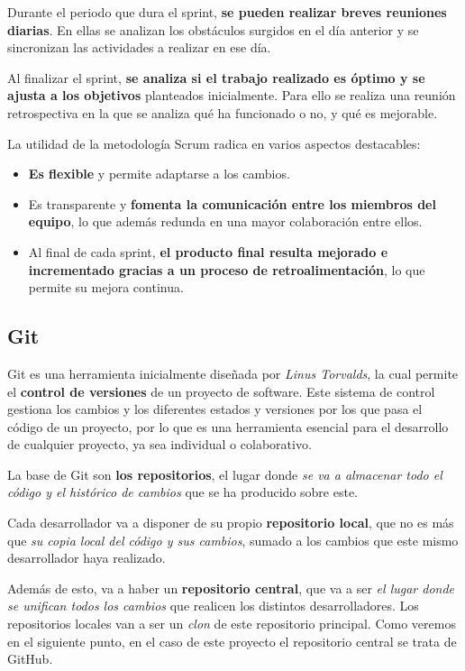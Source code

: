 Durante el periodo que dura el sprint, \textbf{se pueden realizar breves reuniones diarias}. En ellas se analizan los obstáculos surgidos en el día anterior y se sincronizan las actividades a realizar en ese día.

Al finalizar el sprint, \textbf{se analiza si el trabajo realizado es óptimo y se ajusta a los objetivos} planteados inicialmente. Para ello se realiza una reunión retrospectiva en la que se analiza qué ha funcionado o no, y qué es mejorable.

La utilidad de la metodología Scrum radica en varios aspectos destacables:
\begin{itemize}
  \item \textbf{Es flexible} y permite adaptarse a los cambios.
  \item Es transparente y \textbf{fomenta la comunicación entre los miembros del equipo}, lo que además redunda en una mayor colaboración entre ellos.
  \item Al final de cada sprint, \textbf{el producto final resulta mejorado e incrementado gracias a un proceso de retroalimentación}, lo que permite su mejora continua.
\end{itemize}

\subsection{Git}

Git es una herramienta inicialmente diseñada por \textit{Linus Torvalds}, la cual permite el \textbf{control de versiones} de un proyecto de software. Este sistema de control gestiona los cambios y los diferentes estados y versiones por los que pasa el código de un proyecto, por lo que es una herramienta esencial para el desarrollo de cualquier proyecto, ya sea individual o colaborativo. \cite{atlassian:git}

La base de Git son \textbf{los repositorios}, el lugar donde \textit{se va a almacenar todo el código y el histórico de cambios} que se ha producido sobre este. 

Cada desarrollador va a disponer de su propio \textbf{repositorio local}, que no es más que \textit{su copia local del código y sus cambios}, sumado a los cambios que este mismo desarrollador haya realizado. 


Además de esto, va a haber un \textbf{repositorio central}, que va a ser \textit{el lugar donde se unifican todos los cambios} que realicen los distintos desarrolladores. Los repositorios locales van a ser un \textit{clon} de este repositorio principal. Como veremos en el siguiente punto, en el caso de este proyecto el repositorio central se trata de GitHub.

